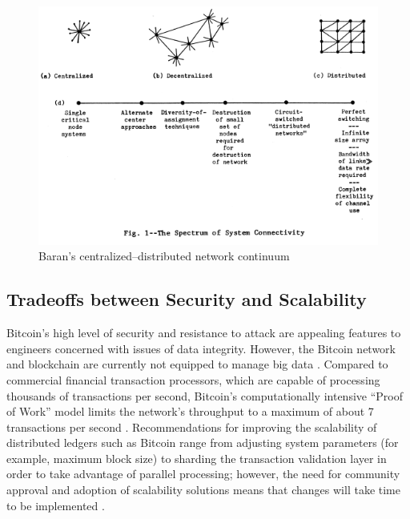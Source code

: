 \documentclass[sigconf]{acmart}
\begin{document}
\begin{figure}
\includegraphics[width=1.0\columnwidth]{images/baran-fig1.png}
\caption{Baran's centralized--distributed network continuum \cite{pB64}}
\label{f:baran}
\end{figure}

\subsection{Tradeoffs between Security and Scalability}
Bitcoin's high level of security and resistance to attack are appealing features to engineers concerned with issues of data integrity. However, the Bitcoin network and blockchain are currently not equipped to manage big data \cite{kC16}. Compared to commercial financial transaction processors, which are capable of processing thousands of transactions per second, Bitcoin's computationally intensive ``Proof of Work'' model limits the network's throughput to a maximum of about 7 transactions per second \cite{kC16}. Recommendations for improving the scalability of distributed ledgers such as Bitcoin range from adjusting system parameters (for example, maximum block size) to sharding the transaction validation layer in order to take advantage of parallel processing; however, the need for community approval and adoption of scalability solutions means that changes will take time to be implemented \cite{kC16}.
\end{document}

